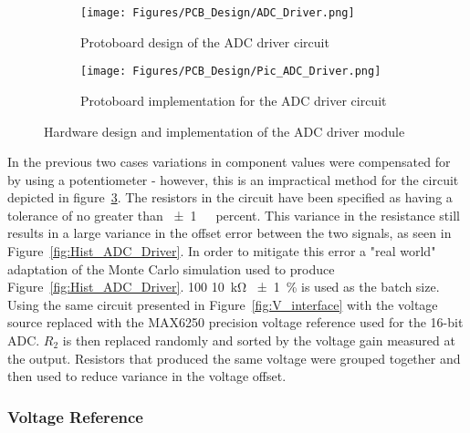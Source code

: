 \begin{figure}[H]
     \centering
     \begin{subfigure}[b]{0.495\textwidth}
        \centering
        \texttt{[image: Figures/PCB\_Design/ADC\_Driver.png]}
        \caption{Protoboard design of the ADC driver circuit \newline}
        \label{fig:ADC_hardware_Design}
     \end{subfigure}
     \hfill
     \begin{subfigure}[b]{0.495\textwidth}
        \centering
        \texttt{[image: Figures/PCB\_Design/Pic\_ADC\_Driver.png]}
        \caption{Protoboard implementation for the ADC driver circuit}
        \label{fig:ADC_hardware_Implementation}
     \end{subfigure}
        \caption{Hardware design and implementation of the ADC driver module}
        \label{fig:ADC_hardware_Comparison}
\end{figure}
In the previous two cases  variations in component values were compensated for by using a potentiometer - however, this is an impractical method for the circuit depicted in figure~\ref{fig:ADC_hardware_Comparison}.
The resistors in the circuit have been specified as having a tolerance of no greater than \qty{\pm 1}{\ percent}. This variance in the resistance still results in a large variance in the offset error between the two signals, as seen in Figure~\ref{fig:Hist_ADC_Driver}. In order to mitigate this error a "real world" adaptation of the  Monte Carlo simulation used to produce Figure~\ref{fig:Hist_ADC_Driver}. 100 \qty{10}{\kohm} \qty{\pm 1}{\percent} is used as the batch size. Using the same circuit presented in Figure~\ref{fig:V_interface} with the voltage source replaced with the  MAX6250 precision voltage reference used for the 16-bit ADC. $R_{2}$ is then replaced randomly and sorted by the voltage gain measured at the output. Resistors that produced the same voltage were grouped together and then used to reduce variance in the voltage offset.
\subsubsection{Voltage Reference}
\label{sec:H_V_Ref}

